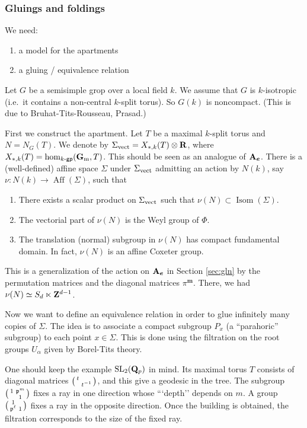 \subsubsection{Gluings and foldings}

We need:
\begin{enumerate}
  \item a model for the apartments
  \item a gluing / equivalence relation 
\end{enumerate}

Let $G$ be a semisimple grop over a local field $k$. We assume that $G$ is 
$k$-isotropic (i.e.\ it contains a non-central $k$-split torus). So 
$G(k)$ is noncompact. (This is due to Bruhat-Tits-Rousseau, Prasad.) 

First we construct the apartment. Let $T$ be a maximal $k$-split torus and 
$N=N_G(T)$. We denote by $\Sigma_{\mathrm{vect}} = X_{\ast,k}(T)\otimes\mathbf{R}$, where 
$X_{\ast,k}(T)=\hom_{k\textnormal{-}\mathsf{gp}}(\mathbf{G}_{\mathrm{m}},T)$. This should 
be seen as an analogue of $\mathbf{A}_{\boldsymbol e}$. There is a (well-defined) 
affine space $\Sigma$ under $\Sigma_{\mathrm{vect}}$ admitting an action by 
$N(k)$, say $\nu:N(k) \to \operatorname{Aff}(\Sigma)$, such that 
\begin{enumerate}
  \item There exists a scalar product on $\Sigma_{\mathrm{vect}}$ such that 
    $\nu(N) \subset \operatorname{Isom}(\Sigma)$. 
  \item The vectorial part of $\nu(N)$ is the Weyl group of $\Phi$. 
  \item The translation (normal) subgroup in $\nu(N)$ has compact fundamental 
    domain. In fact, $\nu(N)$ is an affine Coxeter group. 
\end{enumerate}

This is a generalization of the action on $\mathbf{A}_{\boldsymbol e}$ in 
Section \ref{sec:gln} by the permutation matrices and the diagonal 
matrices $\pi^{\boldsymbol m}$. There, we had 
$\nu(N)\simeq S_d\ltimes \mathbf{Z}^{d-1}$. 

Now we want to define an equivalence relation in order to glue infinitely 
many copies of $\Sigma$. The idea is to associate a compact subgroup 
$P_x$ (a ``parahoric'' subgroup) to each point $x\in \Sigma$. This is done 
using the filtration on the root groups $U_\alpha$ given by Borel-Tits 
theory. 

One should keep the example $\operatorname{SL}_2(\mathbf{Q}_p)$ in mind. Its 
maximal torus $T$ consists of diagonal matrices $\bigl(\begin{smallmatrix} t &  \\  & t^{-1} \end{smallmatrix} \bigr)$, 
and this give a geodesic in the tree. The subgroup 
$\bigl(\begin{smallmatrix} 1 & \mathfrak{p}^m \\  & 1 \end{smallmatrix} \bigr)$ fixes a ray in one direction whose ```depth'' depends 
on $m$. A group $\bigl(\begin{smallmatrix} 1 &  \\ \mathfrak{p}^\ell & 1 \end{smallmatrix} \bigr)$ fixes a ray in the opposite 
direction. Once the building is obtained, the filtration corresponds to the 
size of the fixed ray. 

